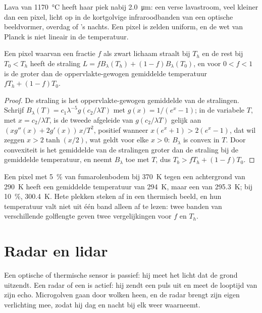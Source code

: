 Lava van \qty{1170}{\celsius} heeft haar piek nabij \qty{2.0}{\micro\metre}: een
verse lavastroom, veel kleiner dan een pixel, licht op in de kortgolvige
infraroodbanden van een optische beeldvormer, overdag of 's nachts. Een pixel is zelden uniform, en
de wet van Planck is niet lineair in de temperatuur.

\begin{proposition}\label{prop:b3:remote-sensing-gis:mixed}
Een pixel waarvan een fractie $f$ als zwart lichaam straalt bij $T_h$ en de rest
bij $T_0 < T_h$ heeft de straling $L = fB_\lambda(T_h) + (1 - f)B_\lambda(T_0)$,
en voor $0 < f < 1$ is de  groter dan de oppervlakte-gewogen
gemiddelde temperatuur $fT_h + (1 - f)T_0$.
\end{proposition}

\begin{proof}
De straling is het oppervlakte-gewogen gemiddelde van de stralingen. Schrijf $B_\lambda(T)
= c_1\lambda^{-5}g(c_2/\lambda T)$ met $g(x) = 1/(e^x - 1)$; in de
variabele $T$, met $x = c_2/\lambda T$, is de tweede afgeleide van
$g(c_2/\lambda T)$ gelijk aan $(x g''(x) + 2g'(x))\,x/T^2$, positief wanneer $x(e^x + 1)
> 2(e^x - 1)$, dat wil zeggen $x > 2\tanh(x/2)$, wat geldt voor elke $x > 0$:
$B_\lambda$ is convex in $T$. Door convexiteit
is het gemiddelde van de stralingen groter dan de straling bij de gemiddelde temperatuur, en
neemt $B_\lambda$ toe met $T$, dus $T_b > fT_h + (1 - f)T_0$.
\end{proof}

Een pixel met \qty{5}{\percent} van
fumarolenbodem bij \qty{370}{K} tegen een achtergrond van \qty{290}{K} heeft een gemiddelde
temperatuur van \qty{294}{K}, maar een  van \qty{295.3}{K};
bij \qty{10}{\percent}, \qty{300.4}{K}. Hete plekken steken af in een thermisch
beeld, en hun temperatuur valt niet uit één band alleen af te lezen: twee banden
van verschillende golflengte geven twee vergelijkingen voor $f$ en $T_h$.

\section{Radar en lidar}\label{sec:b3:remote-sensing-gis:radar}

Een optische of thermische sensor is passief: hij meet het licht dat de grond
uitzendt. Een radar of een  is actief: hij zendt een puls uit en meet de looptijd van zijn echo.
Microgolven gaan door wolken heen, en de radar brengt zijn eigen verlichting mee,
zodat hij dag en nacht bij elk weer waarneemt.

